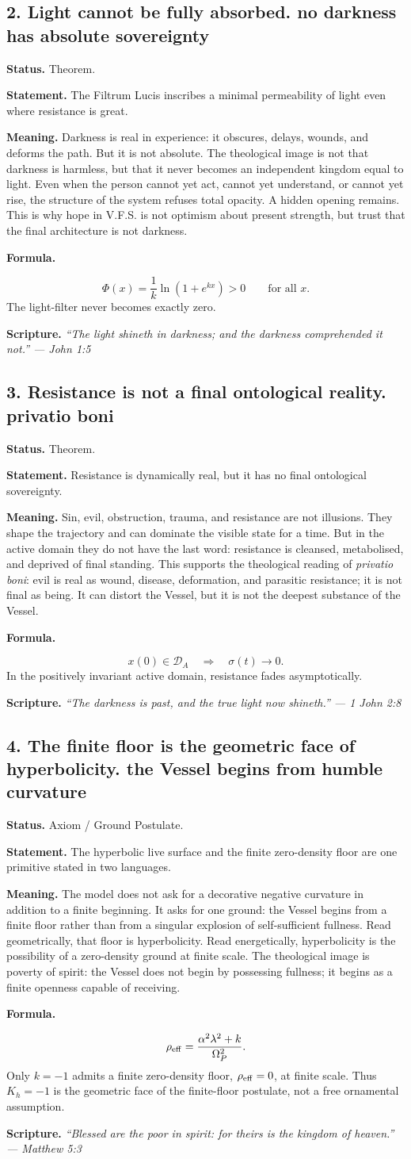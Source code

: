 \documentclass[11pt]{article}
\newcommand{\Op}{\Omega_P}
\newcommand{\DA}{\mathcal{D}_A}
\newcommand{\thesis}[2]{%
  \subsection*{#1. #2}%
}
\newcommand{\status}[1]{\textbf{Status.} #1\par}
\newcommand{\statement}[1]{\textbf{Statement.} #1\par}
\newcommand{\explain}[1]{\textbf{Meaning.} #1\par}
\newcommand{\formula}[1]{\textbf{Formula.}\par #1\par}
\newcommand{\scripture}[2]{\textbf{Scripture.} {\small\itshape ``#1'' --- #2}\par}
\begin{document}
\thesis{2}{Light cannot be fully absorbed. no darkness has absolute sovereignty}
\status{Theorem.}
\statement{The Filtrum Lucis inscribes a minimal permeability of light even where resistance is great.}
\explain{Darkness is real in experience: it obscures, delays, wounds, and deforms the path. But it is not absolute. The theological image is not that darkness is harmless, but that it never becomes an independent kingdom equal to light. Even when the person cannot yet act, cannot yet understand, or cannot yet rise, the structure of the system refuses total opacity. A hidden opening remains. This is why hope in V.F.S. is not optimism about present strength, but trust that the final architecture is not darkness.}
\formula{\[
  \Phi(x)=\frac1k\ln(1+e^{kx})>0\qquad \text{for all }x.
\]
The light-filter never becomes exactly zero.}
\scripture{The light shineth in darkness; and the darkness comprehended it not.}{John 1:5}

\thesis{3}{Resistance is not a final ontological reality. privatio boni}
\status{Theorem.}
\statement{Resistance is dynamically real, but it has no final ontological sovereignty.}
\explain{Sin, evil, obstruction, trauma, and resistance are not illusions. They shape the trajectory and can dominate the visible state for a time. But in the active domain they do not have the last word: resistance is cleansed, metabolised, and deprived of final standing. This supports the theological reading of \emph{privatio boni}: evil is real as wound, disease, deformation, and parasitic resistance; it is not final as being. It can distort the Vessel, but it is not the deepest substance of the Vessel.}
\formula{\[
  x(0)\in\DA\quad\Longrightarrow\quad \sigma(t)\to0.
\]
In the positively invariant active domain, resistance fades asymptotically.}
\scripture{The darkness is past, and the true light now shineth.}{1 John 2:8}


\thesis{4}{The finite floor is the geometric face of hyperbolicity. the Vessel begins from humble curvature}
\status{Axiom / Ground Postulate.}
\statement{The hyperbolic live surface and the finite zero-density floor are one primitive stated in two languages.}
\explain{The model does not ask for a decorative negative curvature in addition to a finite beginning. It asks for one ground: the Vessel begins from a finite floor rather than from a singular explosion of self-sufficient fullness. Read geometrically, that floor is hyperbolicity. Read energetically, hyperbolicity is the possibility of a zero-density ground at finite scale. The theological image is poverty of spirit: the Vessel does not begin by possessing fullness; it begins as a finite openness capable of receiving.}
\formula{\[
  \rho_{\rm eff}=\frac{\alpha^2\lambda^2+k}{\Op^2}.
\]
Only \(k=-1\) admits a finite zero-density floor, \(\rho_{\rm eff}=0\), at finite scale. Thus \(K_h=-1\) is the geometric face of the finite-floor postulate, not a free ornamental assumption.}
\scripture{Blessed are the poor in spirit: for theirs is the kingdom of heaven.}{Matthew 5:3}
\end{document}
